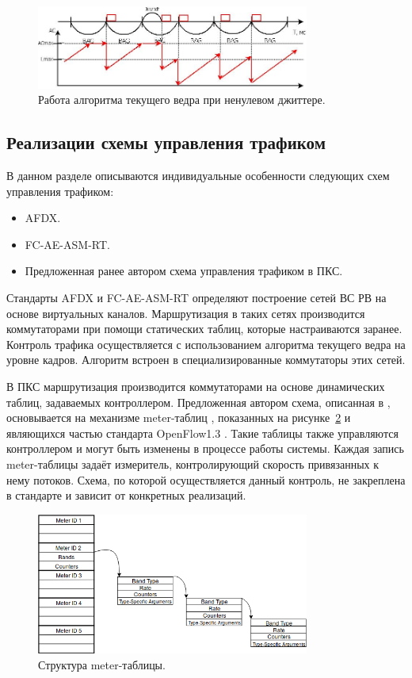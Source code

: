 \documentclass[12pt, a4paper]{article}
\begin{document}
\begin{figure}[h!]
	\centering
	\includegraphics[width=0.80\textwidth]{img/jit.png}
	\caption{Работа алгоритма текущего ведра при ненулевом джиттере.}
	\label{pic:scheme:jit}
\end{figure}
\FloatBarrier

\subsection{Реализации схемы управления трафиком}
В данном разделе описываются индивидуальные особенности следующих схем управления трафиком:
\begin{itemize}
	\item AFDX.
	\item FC-AE-ASM-RT.
	\item Предложенная ранее автором схема управления трафиком в ПКС.
\end{itemize}

Стандарты AFDX и FC-AE-ASM-RT определяют построение сетей ВС РВ на основе виртуальных каналов. Маршрутизация в таких сетях производится коммутаторами при помощи статических таблиц, которые настраиваются заранее. Контроль трафика осуществляется с использованием алгоритма текущего ведра на уровне кадров. Алгоритм встроен в специализированные коммутаторы этих сетей.

В ПКС маршрутизация производится коммутаторами на основе динамических таблиц, задаваемых контроллером. Предложенная автором схема, описанная в \cite{vlsdn}, основывается на механизме meter-таблиц \cite{meter}, показанных на рисунке~\ref{pic:scheme:meter} и являющихся частью стандарта OpenFlow1.3 \cite{openflow}. Такие таблицы также управляются контроллером и могут быть изменены в процессе работы системы. Каждая запись meter-таблицы задаёт измеритель, контролирующий скорость привязанных к нему потоков. Схема, по которой осуществляется данный контроль, не закреплена в стандарте и зависит от конкретных реализаций. 

\begin{figure}[h!]
	\centering
	\includegraphics[width=0.80\textwidth]{img/meter.png}
	\caption{Структура meter-таблицы.}
	\label{pic:scheme:meter}
\end{figure}
\end{document}
